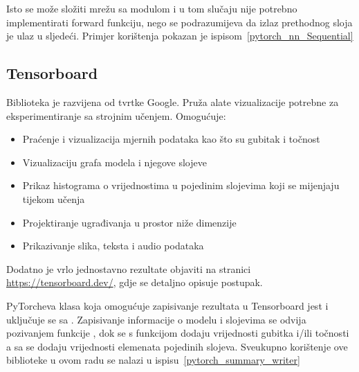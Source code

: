 Isto se može složiti mrežu sa  modulom i u tom slučaju nije potrebno implementirati forward funkciju, nego se podrazumijeva da izlaz prethodnog sloja je ulaz u sljedeći. Primjer korištenja  pokazan je ispisom~\ref{pytorch_nn_Sequential}


\subsection{Tensorboard}
Biblioteka je razvijena od tvrtke Google. Pruža alate vizualizacije potrebne za eksperimentiranje sa strojnim učenjem. 
Omogućuje:
\begin{itemize}
	\item Praćenje i vizualizacija mjernih podataka kao što su gubitak i točnost
	\item Vizualizaciju grafa modela i njegove slojeve
	\item Prikaz histograma o vrijednostima u pojedinim slojevima koji se mijenjaju tijekom učenja
	\item Projektiranje ugrađivanja u prostor niže dimenzije
	\item Prikazivanje slika, teksta i audio podataka
\end{itemize}
Dodatno je vrlo jednostavno rezultate objaviti na stranici \url{https://tensorboard.dev/}, gdje se detaljno opisuje postupak.

PyTorcheva klasa koja omogućuje zapisivanje rezultata u Tensorboard jest  i uključuje se sa . Zapisivanje informacije o modelu i slojevima se odvija pozivanjem funkcije , dok se s funkcijom  dodaju vrijednosti gubitka i/ili točnosti a sa  se dodaju vrijednosti elemenata pojedinih slojeva. Sveukupno korištenje ove biblioteke u ovom radu se nalazi u ispisu~\ref{pytorch_summary_writer}
{}

